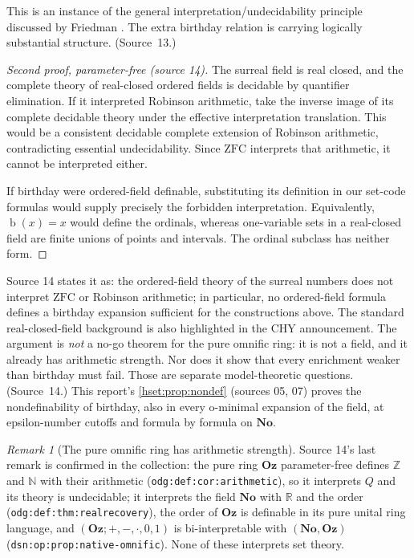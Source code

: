 \documentclass[11pt,letterpaper]{article}
\theoremstyle{definition}
\theoremstyle{remark}
\newtheorem{remark}[remark]{Remark}\aliascntresetthe{remark}
\newcommand{\No}{\mathbf{No}}
\newcommand{\bd}{\operatorname{b}}
\newcommand{\ZFC}{\mathrm{ZFC}}
\newcommand{\lbl}[1]{\nolinkurl{#1}}
\newcommand{\Oz}{\mathbf{Oz}}
\newcommand{\R}{\mathbb R}
\newcommand{\Z}{\mathbb Z}
\newcommand{\N}{\mathbb N}
\begin{document}
This is an instance of the general interpretation/undecidability principle
discussed by Friedman \cite{FriedmanTarski}. The extra birthday relation is
carrying logically substantial structure. (Source~13.)

\begin{proof}[Second proof, parameter-free (source 14)]
The surreal field is real closed, and the complete theory of real-closed ordered
fields is decidable by quantifier elimination. If it interpreted Robinson
arithmetic, take the inverse image of its complete decidable theory under the
effective interpretation translation. This would be a consistent decidable complete
extension of Robinson arithmetic, contradicting essential undecidability. Since
$\ZFC$ interprets that arithmetic, it cannot be interpreted either.

If birthday were ordered-field definable, substituting its definition in our
set-code formulas would supply precisely the forbidden interpretation.
Equivalently, $\bd(x)=x$ would define the ordinals, whereas one-variable sets in a
real-closed field are finite unions of points and intervals. The ordinal subclass
has neither form.
\end{proof}

Source 14 states it as: the ordered-field theory of the surreal numbers does not
interpret $\ZFC$ or Robinson arithmetic; in particular, no ordered-field formula
defines a birthday expansion sufficient for the constructions above. The standard
real-closed-field background is also highlighted in the CHY announcement. The
argument is \emph{not} a no-go theorem for the pure omnific ring: it is not a
field, and it already has arithmetic strength. Nor does it show that every
enrichment weaker than birthday must fail. Those are separate model-theoretic
questions. (Source~14.) This report's \cref{hset:prop:nondef} (sources 05, 07) proves
the nondefinability of birthday, also in every o-minimal expansion of the field, at
epsilon-number cutoffs and formula by formula on $\No$.

\begin{remark}[The pure omnific ring has arithmetic strength]\label{hset:sf:rem:pureoz}
Source 14's last remark is confirmed in the collection: the pure ring $\Oz$
parameter-free defines $\Z$ and $\N$ with their arithmetic
(\lbl{odg:def:cor:arithmetic}), so it interprets $Q$ and its theory is
undecidable; it interprets the field $\No$ with $\R$ and the order
(\lbl{odg:def:thm:realrecovery}), the order of $\Oz$ is definable in its pure unital
ring language, and $(\Oz;+,-,\cdot,0,1)$ is bi-interpretable with $(\No,\Oz)$
(\lbl{dsn:op:prop:native-omnific}). None of these interprets set theory.
\end{remark}
\end{document}
